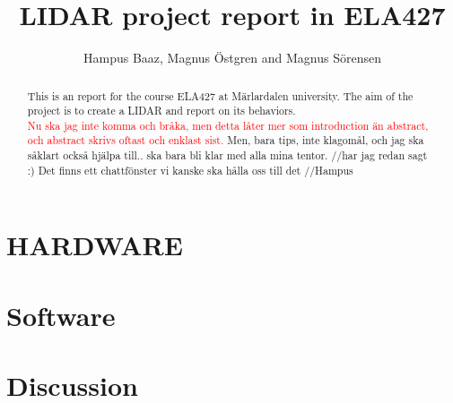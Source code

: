 

\title{\LARGE \bf
LIDAR project report in ELA427}
\author{Hampus Baaz, Magnus Östgren and Magnus Sörensen }


\maketitle
\thispagestyle{empty}
\pagestyle{empty}

\begin{abstract}
This is an report for the course ELA427 at Märlardalen university. The aim of the project is to create a LIDAR and report on its behaviors.\\
\textcolor{red}{Nu ska jag inte komma och bråka, men detta låter mer som introduction än abstract, och abstract skrivs oftast och enklast sist.} Men, bara tips, inte klagomål, och jag ska såklart också hjälpa till.. ska bara bli klar med alla mina tentor. //har jag redan sagt :) Det finns ett chattfönster vi kanske ska hålla oss till det //Hampus
\end{abstract}







\section{HARDWARE}\label{section:hardware}


\section{Software}\label{section:software}



\section{Discussion}\label{section:discussion}


\printbibliography
